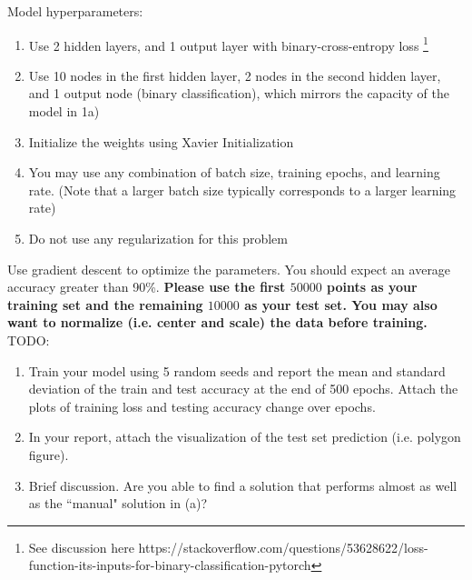 \documentclass[a4paper]{article}
\begin{document}
\begin{enumerate}
\begin{enumerate}
			Model hyperparameters:
			\begin{enumerate}
			    \item Use 2 hidden layers, and 1 output layer with binary-cross-entropy loss \footnote{See discussion here https://stackoverflow.com/questions/53628622/loss-function-its-inputs-for-binary-classification-pytorch}
			    \item Use 10 nodes in the first hidden layer, 2 nodes in the second hidden layer, and 1 output node (binary classification), which mirrors the capacity of the model in 1a)
			    \item Initialize the weights using Xavier Initialization
			    \item You may use any combination of batch size, training epochs, and learning rate. (Note that a larger batch size typically corresponds to a larger learning rate)
			    \item Do not use any regularization for this problem
			\end{enumerate}
			
			Use gradient descent to optimize the parameters. You should expect an average accuracy greater than 90\%. 
			\textbf{Please use the first $50000$ points as your training set and the remaining $10000$ as your test set. You may also want to normalize (i.e. center and scale) the data before training.} \\

			 TODO: 
			 \begin{enumerate}
			 	\item Train your model using 5 random seeds and report the mean and standard deviation of the train and test accuracy at the end of 500 epochs. Attach the plots of training loss and testing accuracy change over epochs.  
				\item In your report, attach the visualization of the test set prediction (i.e. polygon figure).
				\item Brief discussion. Are you able to find a solution that performs almost as well as the ``manual" solution in (a)? 
			\end{enumerate}


\end{enumerate}
\end{enumerate}
\end{document}
